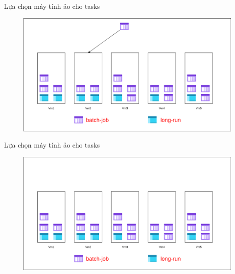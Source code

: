 \documentclass[11pt,xcolor={dvipsnames}, aspectratio=169]{beamer}
\begin{document}
\begin{frame}
{Lựa chọn máy tính ảo cho tasks}
	\begin{figure}
		\vspace{1cm}
		\includegraphics[scale=0.4]{images/balancing_tasks7.png}
	\end{figure}
\end{frame}

\begin{frame}
{Lựa chọn máy tính ảo cho tasks}
	\begin{figure}
		\vspace{1cm}
		\includegraphics[scale=0.4]{images/balancing_tasks8.png}
	\end{figure}
\end{frame}
\end{document}

